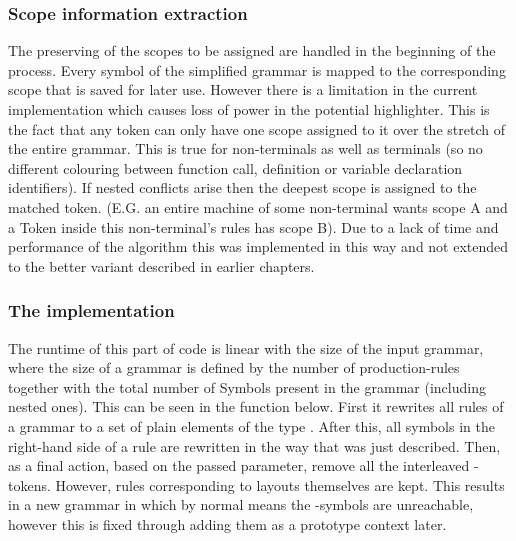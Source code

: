\subsubsection{Scope information extraction}
The preserving of the scopes to be assigned are handled in the beginning of the process. Every symbol of the simplified grammar is mapped to the corresponding scope that is saved for later use. However there is a limitation in the current implementation which causes loss of power in the potential highlighter. This is the fact that any token can only have one scope assigned to it over the stretch of the entire grammar. This is true for non-terminals as well as terminals (so no different colouring between function call, definition or variable declaration identifiers). If nested conflicts arise then the deepest scope is assigned to the matched token. (E.G. an entire machine of some non-terminal wants scope A and a Token inside this non-terminal's rules has scope B). Due to a lack of time and performance of the algorithm this was implemented in this way and not extended to the better variant described in earlier chapters.

\pagebreak

\subsubsection{The implementation}
The runtime of this part of code is linear with the size of the input grammar, where the size of a grammar is defined by the number of production-rules together with the total number of Symbols present in the grammar (including nested ones). This can be seen in the function below. First it rewrites all rules of a grammar to a set of plain elements of the type . After this, all symbols in the right-hand side of a rule are rewritten in the way that was just described. Then, as a final action, based on the passed parameter, remove all the interleaved -tokens. However, rules corresponding to layouts themselves are kept. This results in a new grammar in which by normal means the -symbols are unreachable, however this is fixed through adding them as a prototype context later.



